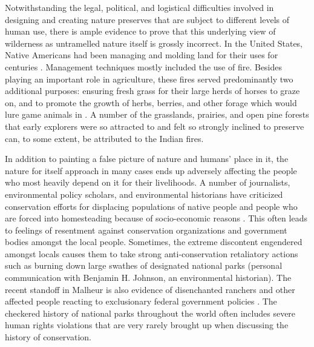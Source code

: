 \documentclass[rutwik_proposal.tex]{subfiles}
\begin{document}
Notwithstanding the legal, political, and logistical difficulties involved in designing and creating nature preserves that are subject to different levels of human use, there is ample evidence to prove that this underlying view of wilderness as untramelled nature itself is grossly incorrect. In the United States, Native Americans had been managing and molding land for their uses for centuries \cite{Langston95, Steinberg13, Butzer99}. Management techniques mostly included the use of fire. Besides playing an important role in agriculture, these fires served predominantly two additional purposes: ensuring fresh grass for their large herds of horses to graze on, and to promote the growth of herbs, berries, and other forage which would lure game animals in \cite{Langston95, Pyne82}. A number of the grasslands, prairies, and open pine forests that early explorers were so attracted to and felt so strongly inclined to preserve can, to some extent, be attributed to the Indian fires.

In addition to painting a false picture of nature and humans' place in it, the nature for itself approach in many cases ends up adversely affecting the people who most heavily depend on it for their livelihoods. A number of journalists, environmental policy scholars, and environmental historians have criticized conservation efforts for displacing populations of native people and people who are forced into homesteading because of socio-economic reasons \cite{Agrawal09, Dowie06, Johnson99}. This often leads to feelings of resentment against conservation organizations and government bodies amongst the local people. Sometimes, the extreme discontent engendered amongst locals causes them to take strong anti-conservation retaliatory actions such as burning down large swathes of designated national parks (personal communication with Benjamin H. Johnson, an environmental historian). The recent standoff in Malheur is also evidence of disenchanted ranchers and other affected people reacting to exclusionary federal government policies \cite{Langston16}. The checkered history of national parks throughout the world often includes severe human rights violations that are very rarely brought up when discussing the history of conservation.
\end{document}
